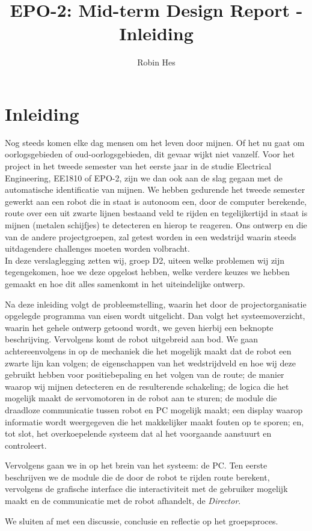 \documentclass{report}
\title{EPO-2: Mid-term Design Report - Inleiding}
\author{Robin Hes}
\begin{document}
\chapter{Inleiding}
\label{ch:inleiding}

Nog steeds komen elke dag mensen om het leven door mijnen. Of het nu gaat om oorlogsgebieden of oud-oorlogsgebieden, dit gevaar wijkt niet vanzelf. Voor het project in het tweede semester van het eerste jaar in de studie Electrical Engineering, EE1810 of EPO-2, zijn we dan ook aan de slag gegaan met de automatische identificatie van mijnen. We hebben gedurende het tweede semester gewerkt aan een robot die in staat is autonoom een, door de computer berekende, route over een uit zwarte lijnen bestaand veld te rijden en tegelijkertijd in staat is mijnen (metalen schijfjes) te detecteren en hierop te reageren. Ons ontwerp en die van de andere projectgroepen, zal getest worden in een wedstrijd waarin steeds uitdagendere challenges moeten worden volbracht.
\\

\noindent
In deze verslaglegging zetten wij, groep D2, uiteen welke problemen wij zijn tegengekomen, hoe we deze opgelost hebben, welke verdere keuzes we hebben gemaakt en hoe dit alles samenkomt in het uiteindelijke ontwerp.

Na deze inleiding volgt de probleemstelling, waarin het door de projectorganisatie opgelegde programma van eisen wordt uitgelicht. Dan volgt het systeemoverzicht, waarin het gehele ontwerp getoond wordt, we geven hierbij een beknopte beschrijving.
Vervolgens komt de robot uitgebreid aan bod. We gaan achtereenvolgens in op de mechaniek die het mogelijk maakt dat de robot een zwarte lijn kan volgen; de eigenschappen van het wedstrijdveld en hoe wij deze gebruikt hebben voor positiebepaling en het volgen van de route; de manier waarop wij mijnen detecteren en de resulterende schakeling; de logica die het mogelijk maakt de servomotoren in de robot aan te sturen; de module die draadloze communicatie tussen robot en PC mogelijk maakt; een display waarop informatie wordt weergegeven die het makkelijker maakt fouten op te sporen; en, tot slot, het overkoepelende systeem dat al het voorgaande aanstuurt en controleert.

Vervolgens gaan we in op het brein van het systeem: de PC. Ten eerste beschrijven we de module die de door de robot te rijden route berekent, vervolgens de  grafische interface die interactiviteit met de gebruiker mogelijk maakt en de communicatie met de robot afhandelt, de \textit{Director}.

We sluiten af met een discussie, conclusie en reflectie op het groepsproces.
\end{document}
